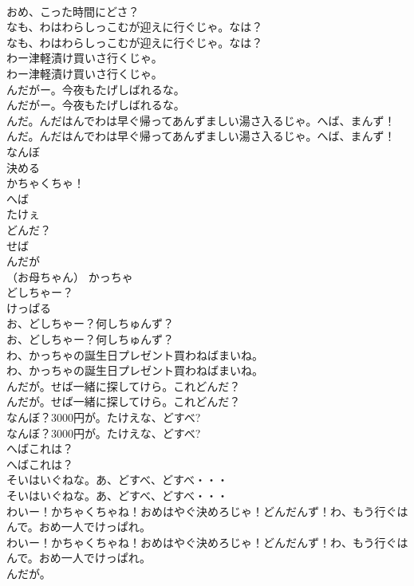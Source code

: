 \documentclass[8pt]{extreport}
\begin{document}
\begin{CJK}{UTF8}{min}
\\	おめ、こった時間にどさ？ 
\\	なも、わはわらしっこむが迎えに行ぐじゃ。なは？	
\\	なも、わはわらしっこむが迎えに行ぐじゃ。なは？ 
\\	わー津軽漬け買いさ行くじゃ。	
\\	わー津軽漬け買いさ行くじゃ。 
\\	んだがー。今夜もたげしばれるな。	
\\	んだがー。今夜もたげしばれるな。 
\\	んだ。んだはんでわは早ぐ帰ってあんずましい湯さ入るじゃ。へば、まんず！	
\\	んだ。んだはんでわは早ぐ帰ってあんずましい湯さ入るじゃ。へば、まんず！ 
\\	なんぼ
\\	決める
\\	かちゃくちゃ！
\\	へば
\\	たけぇ
\\	どんだ？
\\	せば
\\	んだが
\\	（お母ちゃん）	かっちゃ
\\	どしちゃー？
\\	けっぱる
\\	お、どしちゃー？何しちゅんず？	
\\	お、どしちゃー？何しちゅんず？ 
\\	わ、かっちゃの誕生日プレゼント買わねばまいね。	
\\	わ、かっちゃの誕生日プレゼント買わねばまいね。 
\\	んだが。せば一緒に探してけら。これどんだ？	
\\	んだが。せば一緒に探してけら。これどんだ？ 
\\	なんぼ？3000円が。たけえな、どすべ?	
\\	なんぼ？3000円が。たけえな、どすべ? 
\\	へばこれは？	
\\	へばこれは？ 
\\	そいはいぐねな。あ、どすべ、どすべ・・・	
\\	そいはいぐねな。あ、どすべ、どすべ・・・ 
\\	わいー！かちゃくちゃね！おめはやぐ決めろじゃ！どんだんず！わ、もう行ぐはんで。おめ一人でけっぱれ。	
\\	わいー！かちゃくちゃね！おめはやぐ決めろじゃ！どんだんず！わ、もう行ぐはんで。おめ一人でけっぱれ。 
\\	んだが。	

\end{CJK}
\end{document}
